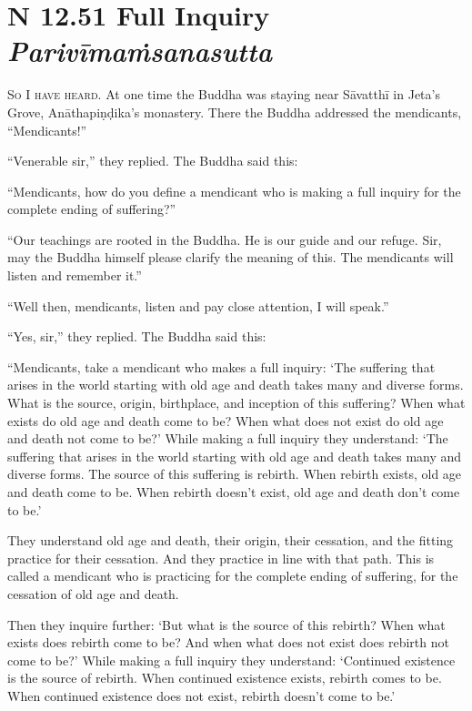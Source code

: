 \documentclass[12pt,openany]{book}%
\newcommand*{\suttatitleacronym}[1]{\smaller[2]{#1}\vspace*{.3em}}
\newcommand*{\suttatitletranslation}[1]{\linebreak{#1}}
\newcommand*{\suttatitleroot}[1]{\linebreak\smaller[2]\itshape{#1}}
\newcommand*{\tocacronym}[1]{\hspace*{-3.3em}{#1}\quad}
\newcommand*{\toctranslation}[1]{#1}
\newcommand*{\tocroot}[1]{(\textit{#1})}
\newcommand*{\scevam}[1]{\textsc{#1}}
\begin{document}
%
\section*{{\suttatitleacronym SN 12.51}{\suttatitletranslation A Full Inquiry }{\suttatitleroot Parivīmaṁsanasutta}}
\addcontentsline{toc}{section}{\tocacronym{SN 12.51} \toctranslation{A Full Inquiry } \tocroot{Parivīmaṁsanasutta}}

\scevam{So I have heard. }At one time the Buddha was staying near \textsanskrit{Sāvatthī} in Jeta’s Grove, \textsanskrit{Anāthapiṇḍika}’s monastery. There the Buddha addressed the mendicants, “Mendicants!” 

“Venerable sir,” they replied. The Buddha said this: 

“Mendicants, how do you define a mendicant who is making a full inquiry for the complete ending of suffering?” 

“Our teachings are rooted in the Buddha. He is our guide and our refuge. Sir, may the Buddha himself please clarify the meaning of this. The mendicants will listen and remember it.” 

“Well then, mendicants, listen and pay close attention, I will speak.” 

“Yes, sir,” they replied. The Buddha said this: 

“Mendicants, take a mendicant who makes a full inquiry: ‘The suffering that arises in the world starting with old age and death takes many and diverse forms. What is the source, origin, birthplace, and inception of this suffering? When what exists do old age and death come to be? When what does not exist do old age and death not come to be?’ While making a full inquiry they understand: ‘The suffering that arises in the world starting with old age and death takes many and diverse forms. The source of this suffering is rebirth. When rebirth exists, old age and death come to be. When rebirth doesn’t exist, old age and death don’t come to be.’ 

They understand old age and death, their origin, their cessation, and the fitting practice for their cessation. And they practice in line with that path. This is called a mendicant who is practicing for the complete ending of suffering, for the cessation of old age and death. 

Then they inquire further: ‘But what is the source of this rebirth? When what exists does rebirth come to be? And when what does not exist does rebirth not come to be?’ While making a full inquiry they understand: ‘Continued existence is the source of rebirth. When continued existence exists, rebirth comes to be. When continued existence does not exist, rebirth doesn’t come to be.’ 
\end{document}
